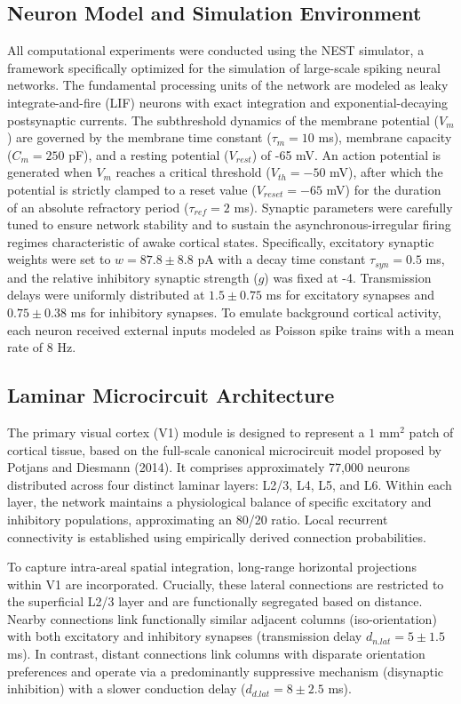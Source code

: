 \subsection{Neuron Model and Simulation Environment}
All computational experiments were conducted using the NEST simulator, a framework specifically optimized for the simulation of large-scale spiking neural networks. The fundamental processing units of the network are modeled as leaky integrate-and-fire (LIF) neurons with exact integration and exponential-decaying postsynaptic currents. The subthreshold dynamics of the membrane potential ($V_m$) are governed by the membrane time constant ($\tau_m = 10$ ms), membrane capacity ($C_m = 250$ pF), and a resting potential ($V_{rest}$) of -65 mV. An action potential is generated when $V_m$ reaches a critical threshold ($V_{th} = -50$ mV), after which the potential is strictly clamped to a reset value ($V_{reset} = -65$ mV) for the duration of an absolute refractory period ($\tau_{ref} = 2$ ms). Synaptic parameters were carefully tuned to ensure network stability and to sustain the asynchronous-irregular firing regimes characteristic of awake cortical states. Specifically, excitatory synaptic weights were set to $w = 87.8 \pm 8.8$ pA with a decay time constant $\tau_{syn} = 0.5$ ms, and the relative inhibitory synaptic strength ($g$) was fixed at -4. Transmission delays were uniformly distributed at $1.5 \pm 0.75$ ms for excitatory synapses and $0.75 \pm 0.38$ ms for inhibitory synapses. To emulate background cortical activity, each neuron received external inputs modeled as Poisson spike trains with a mean rate of 8 Hz.

\subsection{Laminar Microcircuit Architecture}
The primary visual cortex (V1) module is designed to represent a $1 \text{ mm}^2$ patch of cortical tissue, based on the full-scale canonical microcircuit model proposed by Potjans and Diesmann (2014). It comprises approximately 77,000 neurons distributed across four distinct laminar layers: L2/3, L4, L5, and L6. Within each layer, the network maintains a physiological balance of specific excitatory and inhibitory populations, approximating an 80/20 ratio. Local recurrent connectivity is established using empirically derived connection probabilities. 

To capture intra-areal spatial integration, long-range horizontal projections within V1 are incorporated. Crucially, these lateral connections are restricted to the superficial L2/3 layer and are functionally segregated based on distance. Nearby connections link functionally similar adjacent columns (iso-orientation) with both excitatory and inhibitory synapses (transmission delay $d_{n.lat} = 5 \pm 1.5$ ms). In contrast, distant connections link columns with disparate orientation preferences and operate via a predominantly suppressive mechanism (disynaptic inhibition) with a slower conduction delay ($d_{d.lat} = 8 \pm 2.5$ ms).

